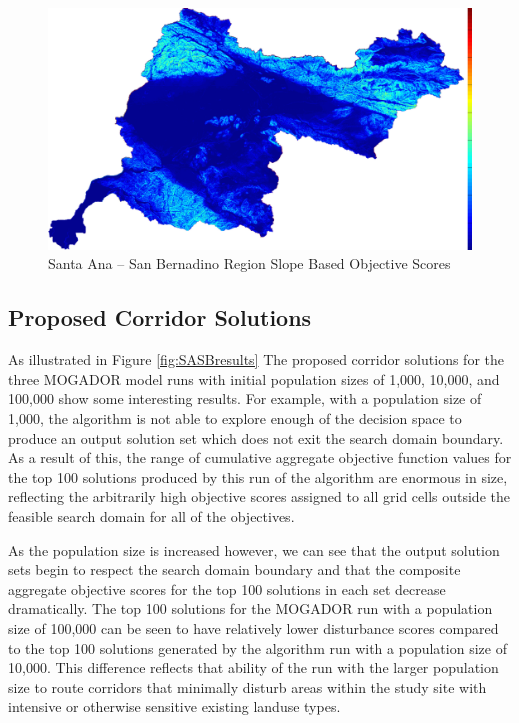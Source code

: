        \begin{figure}[!h]
            \begin{center}
            \includegraphics[width=5.5in]{figures/SanBernadino_SlopeScore.png}   
            \caption{Santa Ana -- San Bernadino Region Slope Based Objective Scores}
            \label{fig:SASBslope}
            \end{center}
        \end{figure}
        
    \subsection{Proposed Corridor Solutions}
    
As illustrated in Figure \ref{fig:SASBresults} The proposed corridor solutions for the three MOGADOR model runs with initial population sizes of 1,000, 10,000, and 100,000 show some interesting results. For example, with a population size of 1,000, the algorithm is not able to explore enough of the decision space to produce an output solution set which does not exit the search domain boundary. As a result of this, the range of cumulative aggregate objective function values for the top 100 solutions produced by this run of the algorithm are enormous in size, reflecting the arbitrarily high objective scores assigned to all grid cells outside the feasible search domain for all of the objectives. 

As the population size is increased however, we can see that the output solution sets begin to respect the search domain boundary and that the composite aggregate objective scores for the top 100 solutions in each set decrease dramatically. The top 100 solutions for the MOGADOR run with a population size of 100,000 can be seen to have relatively lower disturbance scores compared to the top 100 solutions generated by the algorithm run with a population size of 10,000. This difference reflects that ability of the run with the larger population size to route corridors that minimally disturb areas within the study site with intensive or otherwise sensitive existing landuse types.

